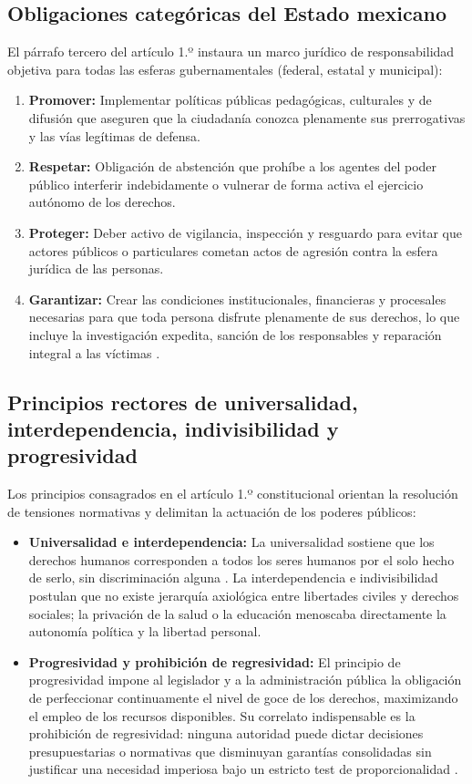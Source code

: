 \documentclass[12pt,spanish,letterpaper,oneside]{article}
\begin{document}
\subsection{Obligaciones categ\'oricas del Estado mexicano}

El p\'arrafo tercero del art\'iculo 1.º instaura un marco jur\'idico de responsabilidad objetiva para todas las esferas gubernamentales (federal, estatal y municipal):
\begin{enumerate}
\item \textbf{Promover:} Implementar pol\'iticas p\'ublicas pedag\'ogicas, culturales y de difusi\'on que aseguren que la ciudadan\'ia conozca plenamente sus prerrogativas y las v\'ias leg\'itimas de defensa.
\item \textbf{Respetar:} Obligaci\'on de abstenci\'on que proh\'ibe a los agentes del poder p\'ublico interferir indebidamente o vulnerar de forma activa el ejercicio aut\'onomo de los derechos.
\item \textbf{Proteger:} Deber activo de vigilancia, inspecci\'on y resguardo para evitar que actores p\'ublicos o particulares cometan actos de agresi\'on contra la esfera jur\'idica de las personas.
\item \textbf{Garantizar:} Crear las condiciones institucionales, financieras y procesales necesarias para que toda persona disfrute plenamente de sus derechos, lo que incluye la investigaci\'on expedita, sanci\'on de los responsables y reparaci\'on integral a las v\'ictimas \citep{carbonellDerechosHumanos2019}.
\end{enumerate}

\subsection{Principios rectores de universalidad, interdependencia, indivisibilidad y progresividad}

Los principios consagrados en el art\'iculo 1.º constitucional orientan la resoluci\'on de tensiones normativas y delimitan la actuaci\'on de los poderes p\'ublicos:
\begin{itemize}
\item \textbf{Universalidad e interdependencia:} La universalidad sostiene que los derechos humanos corresponden a todos los seres humanos por el solo hecho de serlo, sin discriminaci\'on alguna \citep{onuDeclaracion1948ADH}. La interdependencia e indivisibilidad postulan que no existe jerarqu\'ia axiol\'ogica entre libertades civiles y derechos sociales; la privaci\'on de la salud o la educaci\'on menoscaba directamente la autonom\'ia pol\'itica y la libertad personal.
\item \textbf{Progresividad y prohibici\'on de regresividad:} El principio de progresividad impone al legislador y a la administraci\'on p\'ublica la obligaci\'on de perfeccionar continuamente el nivel de goce de los derechos, maximizando el empleo de los recursos disponibles. Su correlato indispensable es la prohibici\'on de regresividad: ninguna autoridad puede dictar decisiones presupuestarias o normativas que disminuyan garant\'ias consolidadas sin justificar una necesidad imperiosa bajo un estricto test de proporcionalidad \citep{nogueira2010teoria}.
\end{itemize}
\end{document}

